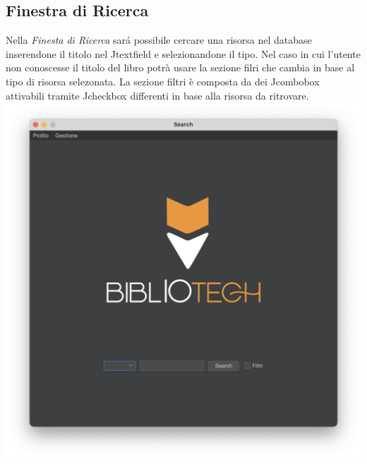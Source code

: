  \subsection{Finestra di Ricerca}
 Nella \textit{Finesta di Ricerca} sar\'a possibile cercare una risorsa nel database inserendone il titolo nel Jtextfield e 
 selezionandone il tipo. Nel caso in cui l'utente non conoscesse il titolo del libro potrà usare la sezione filri che cambia 
 in base al tipo di risorsa selezonata.
 La sezione filtri è composta da dei Jcombobox attivabili tramite Jcheckbox differenti in base alla risorsa da ritrovare.
 \\
 \includegraphics[scale=0.25, center]{Immagini/Schermate/Search/SearchPage.png}


